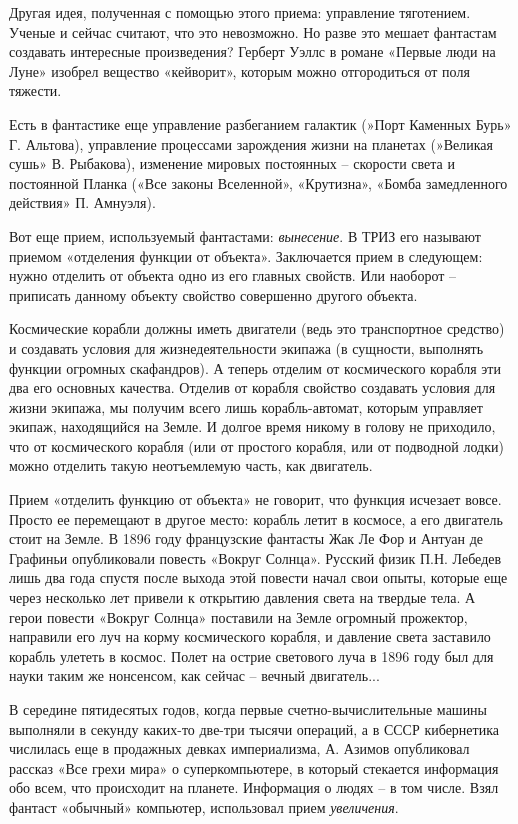 \documentclass[11pt,a4paper]{article}
\begin{document}
Другая идея, полученная с помощью этого приема: управление тяготением. Ученые
и сейчас считают, что это невозможно. Но разве это мешает фантастам создавать
интересные произведения? Герберт Уэллс в романе «Первые люди на Луне» изобрел
вещество «кейворит», которым можно отгородиться от поля тяжести.

Есть в фантастике еще управление разбеганием галактик (»Порт Каменных Бурь»
Г. Альтова), управление процессами зарождения жизни на планетах (»Великая
сушь» В. Рыбакова), изменение мировых постоянных -- скорости света и
постоянной Планка («Все законы Вселенной», «Крутизна», «Бомба замедленного
действия» П. Амнуэля).

Вот еще прием, используемый фантастами: \emph{вынесение}. В ТРИЗ его называют
приемом «отделения функции от объекта». Заключается прием в следующем: нужно
отделить от объекта одно из его главных свойств. Или наоборот -- приписать
данному объекту свойство совершенно другого объекта.

Космические корабли должны иметь двигатели (ведь это транспортное средство) и
создавать условия для жизнедеятельности экипажа (в сущности, выполнять функции
огромных скафандров). А теперь отделим от космического корабля эти два его
основных качества. Отделив от корабля свойство создавать условия для жизни
экипажа, мы получим всего лишь корабль-автомат, которым управляет экипаж,
находящийся на Земле. И долгое время никому в голову не приходило, что от
космического корабля (или от простого корабля, или от подводной лодки) можно
отделить такую неотъемлемую часть, как двигатель.

Прием «отделить функцию от объекта» не говорит, что функция исчезает вовсе.
Просто ее перемещают в другое место: корабль летит в космосе, а его двигатель
стоит на Земле. В 1896 году французские фантасты Жак Ле Фор и Антуан де
Графиньи опубликовали повесть «Вокруг Солнца». Русский физик П.Н. Лебедев лишь
два года спустя после выхода этой повести начал свои опыты, которые еще через
несколько лет привели к открытию давления света на твердые тела. А герои
повести «Вокруг Солнца» поставили на Земле огромный прожектор, направили его
луч на корму космического корабля, и давление света заставило корабль улететь
в космос. Полет на острие светового луча в 1896 году был для науки таким же
нонсенсом, как сейчас -- вечный двигатель...

В середине пятидесятых годов, когда первые счетно-вычислительные машины
выполняли в секунду каких-то две-три тысячи операций, а в СССР кибернетика
числилась еще в продажных девках империализма, А. Азимов опубликовал рассказ
«Все грехи мира» о суперкомпьютере, в который стекается информация обо всем,
что происходит на планете. Информация о людях -- в том числе. Взял фантаст
«обычный» компьютер, использовал прием \emph{увеличения}.
\end{document}
